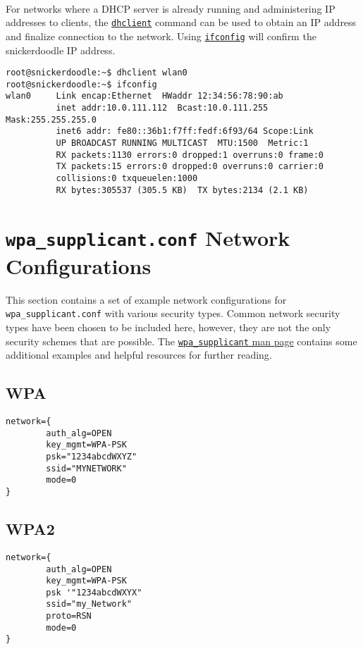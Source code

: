 ~\\
\noindent
For networks where a DHCP server is already running and administering IP addresses to clients, the \href{http://linux.die.net/man/8/dhclient}{\texttt{dhclient}} command can be used to obtain an IP address and finalize connection to the network. Using \href{http://linux.die.net/man/8/ifconfig}{\texttt{ifconfig}} will confirm the snickerdoodle IP address.
                                                                
\begin{lstlisting}
root@snickerdoodle:~$ dhclient wlan0
root@snickerdoodle:~$ ifconfig
wlan0     Link encap:Ethernet  HWaddr 12:34:56:78:90:ab  
          inet addr:10.0.111.112  Bcast:10.0.111.255  Mask:255.255.255.0
          inet6 addr: fe80::36b1:f7ff:fedf:6f93/64 Scope:Link
          UP BROADCAST RUNNING MULTICAST  MTU:1500  Metric:1
          RX packets:1130 errors:0 dropped:1 overruns:0 frame:0
          TX packets:15 errors:0 dropped:0 overruns:0 carrier:0
          collisions:0 txqueuelen:1000 
          RX bytes:305537 (305.5 KB)  TX bytes:2134 (2.1 KB)
\end{lstlisting}


\section{\texttt{wpa\_supplicant.conf} Network Configurations}
\label{sec:wpaconftypes}
This section contains a set of example network configurations for \texttt{wpa\_supplicant.conf} with various security types. Common network security types have been chosen to be included here, however, they are not the only security schemes that are possible. The \href{http://linux.die.net/man/5/wpa_supplicant.conf}{\texttt{wpa\_supplicant} man page} contains some additional examples and helpful resources for further reading.

\subsection{WPA}
\begin{lstlisting}[style=text]
network={
        auth_alg=OPEN
        key_mgmt=WPA-PSK
        psk="1234abcdWXYZ"
        ssid="MYNETWORK"
        mode=0
}
\end{lstlisting}


\subsection{WPA2}
\begin{lstlisting}[style=text]
network={
        auth_alg=OPEN
        key_mgmt=WPA-PSK
        psk '"1234abcdWXYX"
        ssid="my_Network"
        proto=RSN
        mode=0
}
\end{lstlisting}


